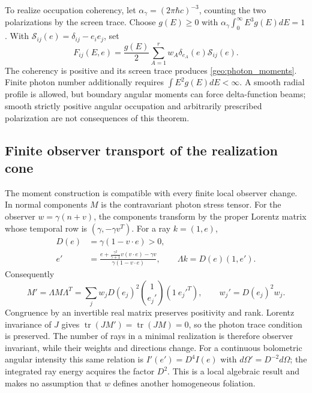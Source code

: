 To realize occupation coherency, let $\alpha_\gamma=(2\pi\hbar c)^{-3}$, counting the two polarizations by the screen trace. Choose $g(E)\ge0$ with
$\alpha_\gamma\int_0^\infty E^3g(E)dE=1$. With $\mathcal S_{ij}(e)=\delta_{ij}-e_ie_j$, set
\begin{equation}
 F_{ij}(E,e)=\frac{g(E)}2\sum_{A=1}^r w_A\delta_{e_A}(e)\mathcal S_{ij}(e).
 \label{geo:photon_occupation}
\end{equation}
The coherency is positive and its screen trace produces \eqref{geo:photon_moments}. Finite photon number additionally requires $\int E^2g(E)dE<\infty$. A smooth radial profile is allowed, but boundary angular moments can force delta-function beams; smooth strictly positive angular occupation and arbitrarily prescribed polarization are not consequences of this theorem.

\subsection{Finite observer transport of the realization cone}
\label{geo:photon_boost_cone}
The moment construction is compatible with every finite local observer change. In normal components $M$ is the contravariant photon stress tensor. For the observer $w=\gamma(n+v)$, the components transform by the proper Lorentz matrix whose temporal row is $(\gamma,-\gamma v^T)$. For a ray $k=(1,e)$,
\begin{align}
 D(e)&=\gamma(1-v\cdot e)>0,\nonumber\\
 e'&=\frac{e+\frac{\gamma^2}{\gamma+1}v(v\cdot e)-\gamma v}
                  {\gamma(1-v\cdot e)},\qquad
 \Lambda k=D(e)(1,e').
 \label{geo:ray_aberration}
\end{align}
Consequently
\begin{equation}
 M'=\Lambda M\Lambda^T
   =\sum_j w_jD(e_j)^2\binom1{e_j'}(1\ e_j'^T),\qquad
 w_j'=D(e_j)^2w_j.
 \label{geo:photon_boost_weights}
\end{equation}
Congruence by an invertible real matrix preserves positivity and rank. Lorentz invariance of $J$ gives $\operatorname{tr}(JM')=\operatorname{tr}(JM)=0$, so the photon trace condition is preserved. The number of rays in a minimal realization is therefore observer invariant, while their weights and directions change. For a continuous bolometric angular intensity this same relation is $I'(e')=D^4I(e)$ with $d\Omega'=D^{-2}d\Omega$; the integrated ray energy acquires the factor $D^2$. This is a local algebraic result and makes no assumption that $w$ defines another homogeneous foliation.

